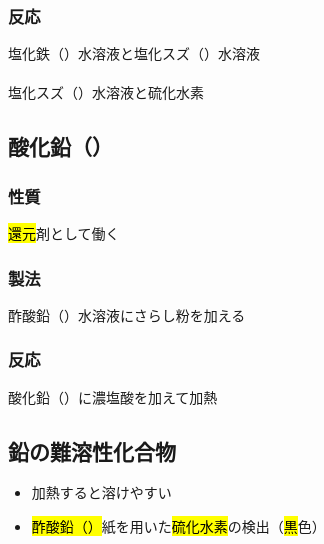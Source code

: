 \subsubsection{反応}
 塩化鉄（）水溶液と塩化スズ（）水溶液\\
 \\
  塩化スズ（）水溶液と硫化水素\\
 \subsection{酸化鉛（）}
 \subsubsection{性質}
 \hl{還元}剤として働く\\
 \subsubsection{製法}
 酢酸鉛（）水溶液にさらし粉を加える
 \subsubsection{反応}
 酸化鉛（）に濃塩酸を加えて加熱\\
 \subsection{鉛の難溶性化合物}
 \begin{itemize}
  \item 加熱すると溶けやすい
  \item \hl{酢酸鉛（）}紙を用いた\hl{硫化水素}の検出（\hl{黒}色）
 \end{itemize}